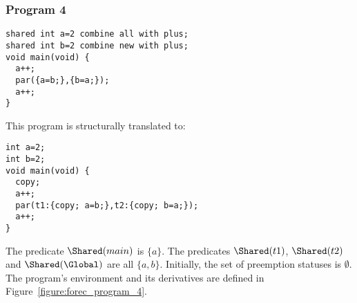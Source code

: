 \subsubsection{Program 4}
\begin{lstlisting}[style=snippet]
shared int a=2 combine all with plus;
shared int b=2 combine new with plus;
void main(void) {
  a++;
  par({a=b;},{b=a;});
  a++;
}
\end{lstlisting}
This program is structurally translated to:
\begin{lstlisting}[style=snippet]
int a=2;
int b=2;
void main(void) {
  copy;
  a++;
  par(t1:{copy; a=b;},t2:{copy; b=a;});
  a++;
}
\end{lstlisting}
The predicate $\Shared(main)$ is $\lbrace a \rbrace$.
The predicates $\Shared(t1)$, $\Shared(t2)$ and 
$\Shared(\Global)$ are all $\lbrace a, b \rbrace$.
Initially, the set of preemption statuses \Abort{}
is $\emptyset$. The program's environment \Environment{} and its 
derivatives are defined in Figure~\ref{figure:forec_program_4}.
\newline

